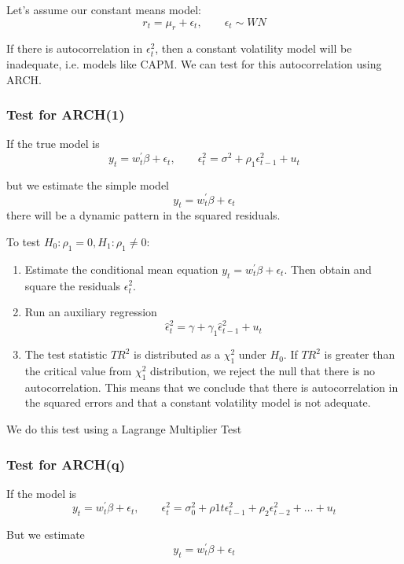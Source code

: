 \documentclass[11pt]{article}
\begin{document}
Let's assume our constant means model:
\[r_t = \mu_r + \epsilon_t, \qquad \epsilon_t \sim WN\]

If there is autocorrelation in $\epsilon_t^2$, then a constant volatility model will be inadequate, i.e. models like CAPM. We can test for this autocorrelation using ARCH.

\subsubsection{Test for ARCH(1)}
If the true model is
\[y_t = w_t^\prime \beta + \epsilon_t, \qquad \epsilon_t^2 = \sigma^2 + \rho_1 \epsilon_{t-1}^2 + u_t\]

but we estimate the simple model
\[y_t = w_t^\prime \beta + \epsilon_t\]
there will be a dynamic pattern in the squared residuals.

\begin{procedure}

To test $H_0:\rho_1=0, H_1: \rho_1 \neq 0$:
\begin{enumerate}
\item Estimate the conditional mean equation $y_t = w_t^\prime \beta + \epsilon_t$. Then obtain and square the residuals $\epsilon_t^2$.

\item Run an auxiliary regression
\[\hat{\epsilon}_t^2 = \gamma + \gamma_1\hat{\epsilon}_{t-1}^2 + u_t\]

\item The test statistic $TR^2$ is distributed as a $\chi_1^2$ under $H_0$. If $TR^2$ is greater than the critical value from $\chi_1^2$ distribution, we reject the null that there is no autocorrelation. This means that we conclude that there is autocorrelation in the squared errors and that a constant volatility model is not adequate.
\end{enumerate}

We do this test using a Lagrange Multiplier Test

\end{procedure}

\subsubsection{Test for ARCH(q)}

If the model is
\[y_t = w_t^\prime \beta + \epsilon_t, \qquad \epsilon_t^2 = \sigma_0^2 + \rho1t \epsilon_{t-1}^2 + \rho_2 \epsilon_{t-2}^2 + \ldots + u_t\]

But we estimate
\[y_t = w_t^\prime \beta + \epsilon_t\]
\end{document}
